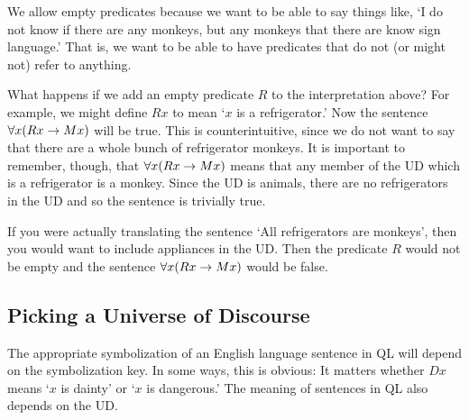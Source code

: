 We allow empty predicates because we want to be able to say things like, `I do not know if there are any monkeys, but any monkeys that there are know sign language.' That is, we want to be able to have predicates that do not (or might not) refer to anything.


What happens if we add an empty predicate $R$ to the interpretation above? For example, we might define $Rx$ to mean `$x$ is a refrigerator.' Now the sentence $\forall x(Rx \rightarrow Mx)$ will be true. This is counterintuitive, since we do not want to say that there are a whole bunch of refrigerator monkeys. It is important to remember, though, that $\forall x(Rx \rightarrow Mx)$ means that any member of the UD which is a refrigerator is a monkey. Since the UD is animals, there are no refrigerators in the UD and so the sentence is trivially true.

If you were actually translating the sentence `All refrigerators are monkeys', then you would want to include appliances in the UD. Then the predicate $R$ would not be empty and the sentence $\forall x(Rx \rightarrow Mx)$ would be false.

\begin{table}[h!]
\end{table}

\subsection{Picking a Universe of Discourse}
The appropriate symbolization of an English language sentence in QL will depend on the symbolization key. In some ways, this is obvious: It matters whether $Dx$ means `$x$ is dainty' or `$x$ is dangerous.' The meaning of sentences in QL also depends on the UD.

